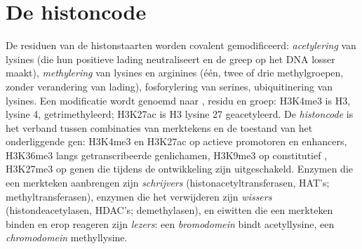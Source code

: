 \section{De histoncode}

\begin{definition}[Histonmodificaties]\label{def:b3:chromatin-epigenetics:histone-code}
De residuen van de histonstaarten worden covalent gemodificeerd:
\emph{acetylering} van lysines (die hun positieve lading neutraliseert
en de greep op het DNA losser maakt), \emph{methylering} van lysines
en arginines (één, twee of drie methylgroepen, zonder verandering van
lading), fosforylering van serines, ubiquitinering van lysines. Een
modificatie wordt genoemd naar , residu en groep: H3K4me3 is
 H3, lysine 4, getrimethyleerd; H3K27ac is H3 lysine 27
geacetyleerd. De \emph{histoncode} is het verband tussen combinaties
van merktekens en de toestand van het onderliggende gen: H3K4me3 en
H3K27ac op actieve promotoren en enhancers, H3K36me3 langs
getranscribeerde genlichamen, H3K9me3 op constitutief
, H3K27me3 op genen die tijdens de ontwikkeling zijn
uitgeschakeld. Enzymen die een merkteken aanbrengen zijn
\emph{schrijvers} (histonacetyltransferasen, HAT's; methyltransferasen),
enzymen die het verwijderen zijn \emph{wissers} (histondeacetylasen,
HDAC's; demethylasen), en eiwitten die een merkteken binden en erop
reageren zijn \emph{lezers}: een \emph{bromodomein} bindt
acetyllysine, een \emph{chromodomein} methyllysine.
\end{definition}

